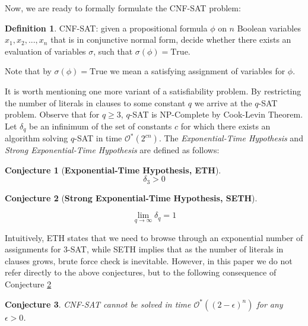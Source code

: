 \documentclass[en]{pracamgr}
\newtheorem{conjecture}{Conjecture}
\theoremstyle{definition}
\newtheorem{definition}{Definition}
\newcommand{\cnfsat}{{\sc CNF-SAT}}
\newcommand{\true}{\textrm{True}}
\begin{document}
Now, we are ready to formally formulate the \cnfsat{} problem:

\begin{definition}
	\cnfsat{}: given a propositional formula $\phi$ on $n$ Boolean variables $x_1,x_2,...,x_n$ that is in conjunctive normal form, decide whether there exists an evaluation of variables $\sigma$, such that $\sigma(\phi)=\true$.
\end{definition}

\noindent
Note that by $\sigma(\phi)=\true$ we mean a satisfying assignment of variables for $\phi$.

It is worth mentioning one more variant of a satisfiability problem. By restricting the number of literals in clauses to some constant $q$ we arrive at the $q$-{\sc SAT} problem. Observe that for $q \geq 3$, $q$-{\sc SAT} is NP-Complete by Cook-Levin Theorem. Let $\delta_q$ be an infinimum of the set of constants $c$ for which there exists an algorithm solving $q$-{\sc SAT} in time $\mathcal{O}^*(2^{cn})$. The \textit{Exponential-Time Hypothesis} and \textit{Strong Exponential-Time Hypothesis} are defined as follows:

\begin{conjecture}[\textbf{Exponential-Time Hypothesis, ETH}]

\begin{equation*}
	\delta_3 > 0
\end{equation*}
\end{conjecture}

\begin{conjecture}[\textbf{Strong Exponential-Time Hypothesis, SETH}]\label{SETH}
	
	\begin{equation*}
	\lim\limits_{q \rightarrow \infty}\delta_q = 1
	\end{equation*}
\end{conjecture}

Intuitively, ETH states that we need to browse through an exponential number of assignments for $3$-{\sc SAT}, while SETH implies that as the number of literals in clauses grows, brute force check is inevitable. However, in this paper we do not refer directly to the above conjectures, but to the following consequence of Conjecture \ref{SETH}

\begin{conjecture}
	\cnfsat{} cannot be solved in time $\mathcal{O}^*((2-\epsilon)^n)$ for any $\epsilon>0$.
\end{conjecture}
\end{document}
